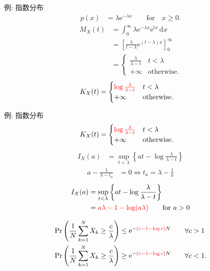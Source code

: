 \documentclass[lualatex,handout]{beamer}
\newcommand{\emm}[1]{\textcolor{red}{#1}}
\newcommand\dx{{\,\mathrm{d}x}}
\theoremstyle{definition}
\begin{document}
\begin{frame}{例: 指数分布}
\begin{align*}
p(x) &= \lambda\mathrm{e}^{-\lambda x}\qquad\text{for}\quad x\ge 0.
\end{align*}
\begin{align*}
M_X(t) &= \int_{0}^\infty \lambda\mathrm{e}^{-\lambda x} \mathrm{e}^{tx}\dx\\
&=\left[\frac{\lambda}{t-\lambda}\mathrm{e}^{(t-\lambda)x}\right]_0^{\infty}\\
&=\begin{cases}
\frac{\lambda}{\lambda-t}& t < \lambda\\
+\infty&\text{otherwise.}
\end{cases}
\end{align*}
\begin{align*}
K_X(t) &=
\begin{cases}
\emm{\log\frac{\lambda}{\lambda-t}}& t < \lambda\\
+\infty&\text{otherwise.}
\end{cases}
\end{align*}
\end{frame}

\begin{frame}{例: 指数分布}
\small
\begin{align*}
K_X(t) &=
\begin{cases}
\emm{\log\frac{\lambda}{\lambda-t}}& t < \lambda\\
+\infty&\text{otherwise.}
\end{cases}
\end{align*}
\begin{align*}
I_X(a) &= \sup_{t<\lambda} \left\{at - \log\frac{\lambda}{\lambda-t}\right\}
\end{align*}
\begin{align*}
a - \frac1{\lambda-t_a} &=0 \iff  t_a = \lambda-\frac1a
\end{align*}
\begin{align*}
I_X(a) &= \sup_{t<\lambda} \left\{at - \log\frac{\lambda}{\lambda-t}\right\}\\
&=
\emm{a\lambda - 1 - \log(a\lambda)}
\qquad\text{for } a> 0
\end{align*}

\begin{align*}
\Pr\left(\frac1N\sum_{k=1}^N X_k \ge \frac{c}{\lambda}\right) &\le \mathrm{e}^{-\emm{(c-1-\log c)}N} \qquad\forall c>1\\
\Pr\left(\frac1N\sum_{k=1}^N X_k \ge \frac{c}{\lambda}\right) &\ge \mathrm{e}^{-\emm{(c-1-\log c)}N} \qquad\forall c<1.
\end{align*}
\end{frame}
\end{document}
